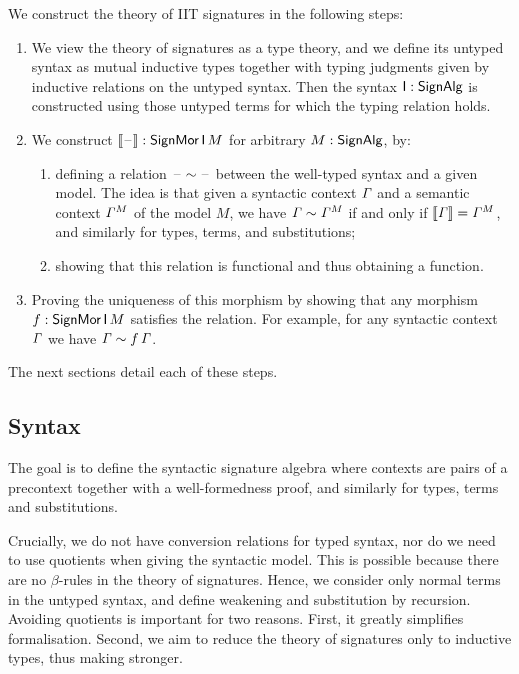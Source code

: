 


We construct the theory of IIT signatures in the following steps:
\begin{enumerate}
\item We view the theory of signatures as a type theory, and we define
  its untyped syntax as mutual inductive types together with typing
  judgments given by inductive relations on the untyped syntax. Then
  the syntax $\mathsf{I} : \mathsf{SignAlg}$ is constructed using those untyped terms
  for which the typing relation holds.
\item We construct $\llbracket\mathord{\hspace{1pt}\text{--}\hspace{1pt}}\rrbracket:\mathsf{SignMor}\,\mathsf{I}\,M$ for arbitrary
  $M : \mathsf{SignAlg}$, by:
  \begin{enumerate}
  \item defining a relation $\mathord{\hspace{1pt}\text{--}\hspace{1pt}} \sim \mathord{\hspace{1pt}\text{--}\hspace{1pt}}$ between the well-typed syntax
    and a given model. The idea is that given a syntactic context $\mathit{\Gamma}$ and a
    semantic context ${\mathit{\Gamma}}^M$ of the model $M$, we have
    $\mathit{\Gamma} \sim {\mathit{\Gamma}}^M$ if and only if $\llbracket\mathit{\Gamma}\rrbracket
    = {\mathit{\Gamma}}^M$, and similarly for types, terms, and substitutions;
  \item showing that this relation is functional and thus obtaining a function.
    \end{enumerate}
  \item Proving the uniqueness of this morphism by showing that any morphism
    $f:\mathsf{SignMor}\,\mathsf{I}\,M$ satisfies the relation. For example, for any syntactic context
    $\mathit{\Gamma}$ we have $\mathit{\Gamma}\sim f\,\mathit{\Gamma}$.
\end{enumerate}
The next sections detail each of these steps.

\subsection{Syntax}

The goal is to define the syntactic signature algebra where contexts
are pairs of a precontext together with a well-formedness proof, and
similarly for types, terms and substitutions.

Crucially, we do not have conversion relations for typed syntax, nor
do we need to use quotients when giving the syntactic model. This is
possible because there are no $\beta$-rules in the theory of
signatures. Hence, we consider only normal terms in the untyped
syntax, and define weakening and substitution by recursion.  Avoiding
quotients is important for two reasons. First, it greatly simplifies
formalisation. Second, we aim to reduce the theory of signatures only
to inductive types, thus making  stronger.

